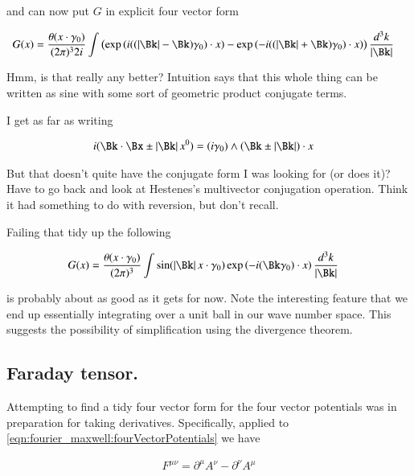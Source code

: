 and can now put $G$ in explicit four vector form

\begin{align*}
G(x)
&= 
\frac{\theta(x \cdot \gamma_0)}{
(2\pi)^3 2 i 
} \int
\left(
\exp\left( i ((\Abs{\Bk} -\Bk)\gamma_0) \cdot x \right)
-\exp\left( -i ((\Abs{\Bk} +\Bk)\gamma_0) \cdot x \right)
\right)
\frac{d^3 k}{ \Abs{\Bk} }
\end{align*}

Hmm, is that really any better?  Intuition says that this whole thing 
can be written as sine with some sort of geometric product conjugate 
terms.

I get as far as writing 

\begin{align*}
i ( \Bk \cdot \Bx \pm \Abs{\Bk} x^0 ) 
&=
(i \gamma_0) \wedge ( \Bk \pm \Abs{\Bk} ) \cdot x
\end{align*}

But that doesn't quite have the conjugate form I was looking for (or does it)?  Have to go back and look at Hestenes's multivector conjugation operation.  Think it had something to do with reversion, but don't recall.

Failing that tidy up the following

\begin{align}
G(x)
&= 
\frac{\theta(x \cdot \gamma_0)}{ (2\pi)^3 }
\int
\sin( \Abs{\Bk} x \cdot \gamma_0 )
\exp\left( -i (\Bk \gamma_0) \cdot x \right)
\frac{d^3 k}{ \Abs{\Bk} }
\end{align}

is probably about as good as it gets for now.  Note the interesting feature
that we end up essentially integrating over a unit ball in our wave number
space.  This suggests the possibility of simplification using the 
divergence theorem.

\subsection{Faraday tensor. }

Attempting to find a tidy four vector form for the four vector potentials was in preparation for taking derivatives.
Specifically, applied to \ref{eqn:fourier_maxwell:fourVectorPotentials} we have

\begin{align*}
F^{\mu\nu} = \partial^\mu A^\nu - \partial^\nu A^\mu
\end{align*}

